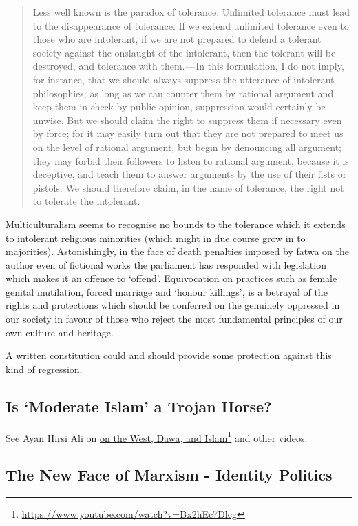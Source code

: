 \documentclass[14pt,titlepage]{extarticle}
\newcommand{\hreg}[2]{\href{#1}{#2}\footnote{\url{#1}}}
\begin{document}
\begin{quote}
Less well known is the paradox of tolerance: Unlimited tolerance must lead to the disappearance of tolerance. If we extend unlimited tolerance even to those who are intolerant, if we are not prepared to defend a tolerant society against the onslaught of the intolerant, then the tolerant will be destroyed, and tolerance with them. — In this formulation, I do not imply, for instance, that we should always suppress the utterance of intolerant philosophies; as long as we can counter them by rational argument and keep them in check by public opinion, suppression would certainly be unwise. But we should claim the right to suppress them if necessary even by force; for it may easily turn out that they are not prepared to meet us on the level of rational argument, but begin by denouncing all argument; they may forbid their followers to listen to rational argument, because it is deceptive, and teach them to answer arguments by the use of their fists or pistols. We should therefore claim, in the name of tolerance, the right not to tolerate the intolerant.
\end{quote}

Multiculturalism seems to recognise no bounds to the tolerance which it extends to intolerant religious minorities (which might in due course grow in to majorities).
Astonishingly, in the face of death penalties imposed by fatwa on the author even of fictional works the parliament has responded with legislation which makes it an offence to `offend'.
Equivocation on practices such as female genital mutilation, forced marriage and `honour killings', is a betrayal of the rights and protections which should be conferred on the genuinely oppressed in our society in favour of those who reject the most fundamental principles of our own culture and heritage.

A written constitution could and should provide some protection against this kind of regression.

\subsection{Is `Moderate Islam' a Trojan Horse?}

See Ayan Hirsi Ali on  \hreg{https://www.youtube.com/watch?v=Bx2hEc7Dlcg}{on the West, Dawa, and Islam} and other videos.

\subsection{The New Face of Marxism - Identity Politics}
\end{document}
